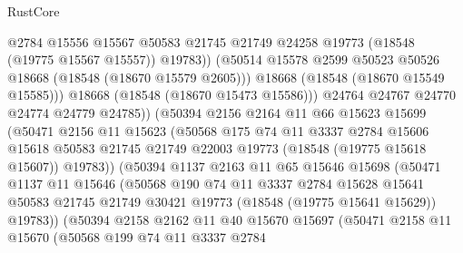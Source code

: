 \begin{lexlean}{RustCore}
\begin{coremodule}
                          @2784
                          @15556
                          @15567
                          @50583
                          @21745
                          @21749
                          @24258
                          @19773
                          (@18548 (@19775 @15567 @15557))
                          @19783))
                      (@50514 @15578 @2599 @50523 @50526 @18668 (@18548 (@18670 @15579 @2605)))
                      @18668
                      (@18548 (@18670 @15549 @15585)))
                    @18668
                    (@18548 (@18670 @15473 @15586)))
                  @24764
                  @24767
                  @24770
                  @24774
                  @24779
                  @24785))
              (@50394
                @2156
                @2164
                @11
                @66
                @15623
                @15699
                (@50471
                  @2156
                  @11
                  @15623
                  (@50568
                    @175
                    @74
                    @11
                    @3337
                    @2784
                    @15606
                    @15618
                    @50583
                    @21745
                    @21749
                    @22003
                    @19773
                    (@18548 (@19775 @15618 @15607))
                    @19783))
                (@50394
                  @1137
                  @2163
                  @11
                  @65
                  @15646
                  @15698
                  (@50471
                    @1137
                    @11
                    @15646
                    (@50568
                      @190
                      @74
                      @11
                      @3337
                      @2784
                      @15628
                      @15641
                      @50583
                      @21745
                      @21749
                      @30421
                      @19773
                      (@18548 (@19775 @15641 @15629))
                      @19783))
                  (@50394
                    @2158
                    @2162
                    @11
                    @40
                    @15670
                    @15697
                    (@50471
                      @2158
                      @11
                      @15670
                      (@50568
                        @199
                        @74
                        @11
                        @3337
                        @2784

\end{coremodule}
\end{lexlean}
